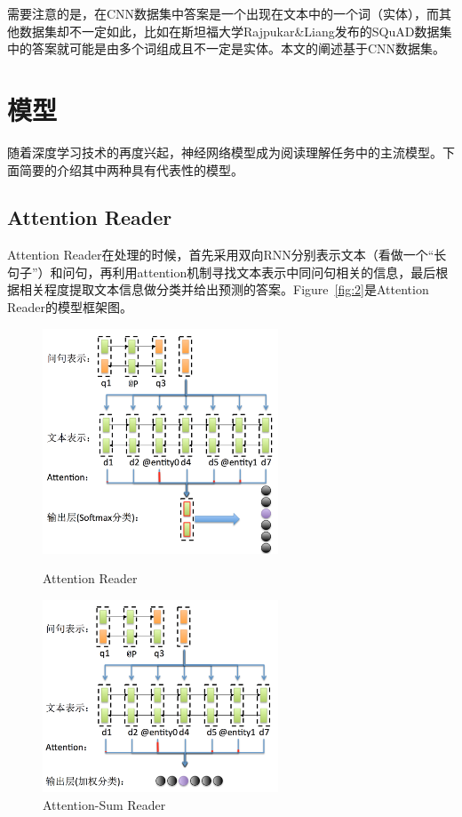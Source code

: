 \documentclass[11pt]{article}
\begin{document}
需要注意的是，在CNN数据集中答案是一个出现在文本中的一个词（实体），而其他数据集却不一定如此，比如在斯坦福大学Rajpukar\&Liang发布的SQuAD\cite{rajpurkar2016squad}数据集中的答案就可能是由多个词组成且不一定是实体。本文的阐述基于CNN数据集。

\section{模型}
随着深度学习技术的再度兴起，神经网络模型成为阅读理解任务中的主流模型。下面简要的介绍其中两种具有代表性的模型。
\subsection{Attention Reader}
Attention Reader\cite{hermann2015teaching}在处理的时候，首先采用双向RNN分别表示文本（看做一个“长句子”）和问句，再利用attention机制寻找文本表示中同问句相关的信息，最后根据相关程度提取文本信息做分类并给出预测的答案。Figure~\ref{fig:2}是Attention Reader的模型框架图。

\begin{figure}[htbp]
\centering
\begin{minipage}[t]{0.45\textwidth}
\centering
\includegraphics[width=70mm]{picture/attentionreader.png}
\caption{Attention Reader}
\label{fig:2}
\end{minipage}
\begin{minipage}[t]{0.45\textwidth}
\centering
\includegraphics[width=70mm]{picture/attensumreader.png}
\caption{Attention-Sum Reader}
\label{fig:3}
\end{minipage}
\end{figure}
\end{document}
